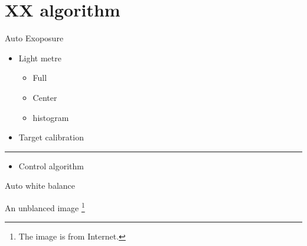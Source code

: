 \documentclass[presentation]{beamer}
\begin{document}
\section{XX algorithm}
\label{sec:org74ded4a}
\begin{frame}[label={sec:org187b276}]{Auto Exoposure}
\begin{itemize}
\item Light metre
\begin{itemize}
\item Full
\item Center
\item histogram
\end{itemize}
\item Target calibration
\end{itemize}

\center\rule{0.5\paperwidth}{0.4pt}

\begin{itemize}
\item Control algorithm
\end{itemize}
\end{frame}
\begin{frame}[label={sec:orgf4575d5}]{Auto white balance}
\begin{block}{An unblanced image}
 \footnote{The image is from Internet.}
\end{block}
\end{frame}
\end{document}
